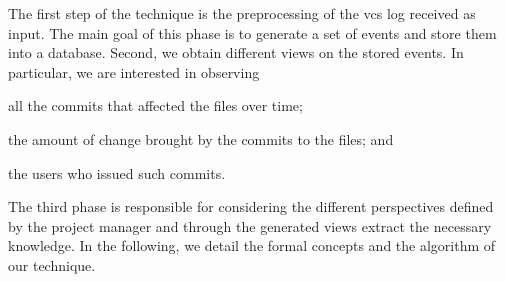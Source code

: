 The first step of the technique is the preprocessing of the \gls{vcs} log received as input. The main goal of this phase is to generate a set of events and store them into a database. Second, we obtain different views on the stored events. In particular, we are interested in observing
\begin{inparaenum}[\itshape i)]
	\item all the commits that affected the files over time;
	\item the amount of change brought by the commits to the files; and
	\item the users who issued such commits.
\end{inparaenum}
The third phase is responsible for considering the different perspectives defined by the project manager and through the generated views extract the necessary knowledge. In the following, we detail the formal concepts and the algorithm of our technique.



%





%



%

%

